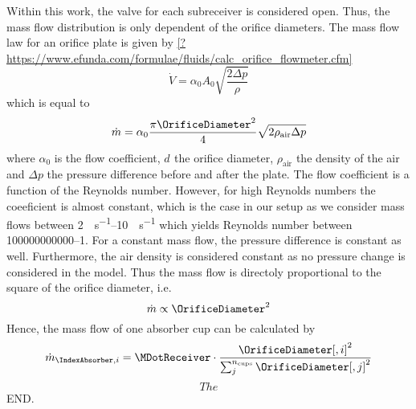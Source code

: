 Within this work, the valve for each subreceiver is considered open.
Thus, the mass flow distribution is only dependent of the orifice diameters.
The mass flow law for an orifice plate is given by \cref{?https://www.efunda.com/formulae/fluids/calc_orifice_flowmeter.cfm}
\begin{equation}
    \dot{V} = \alpha_0 A_0 \sqrt{\frac{2 \Delta p}{\rho}}
\end{equation}
which is equal to
\begin{equation}
    \dot{m} = \alpha_0 \frac{\pi \OrificeDiameter^2}{4} \sqrt{2 \rho_{\mathrm{air}} \Delta p }
\end{equation}
where \(\alpha_0\) is the flow coefficient, \(d_{}\) the orifice diameter,  \(\rho_{\mathrm{air}}\) the density of the air and \(\Delta p\) the pressure difference before and after the plate.
The flow coefficient is a function of the Reynolds number.
However, for high Reynolds numbers the coeeficient is almost constant, which is the case in our setup as we consider mass flows between \SIrange{2}{10}{\kilo\per\second} which yields Reynolds number between \numrange{100000000000}{1}.
For a constant mass flow, the pressure difference is constant as well.
Furthermore, the air density is considered constant as no pressure change is considered in the model.
Thus the mass flow is directoly proportional to the square of the orifice diameter, i.e.
\begin{equation}
    \dot{m} \propto \OrificeDiameter^2
\end{equation}
Hence, the mass flow of one absorber cup can be calculated by
\begin{equation}
    \dot{m}_{\IndexAbsorber, i} =\MDotReceiver \cdot \frac{\OrificeDiameter[,i]^2}{\sum_j^{n_{\mathrm{cups}}}\OrificeDiameter[,j]^2}
\end{equation}
\begin{equation}
    The
\end{equation}
END.


